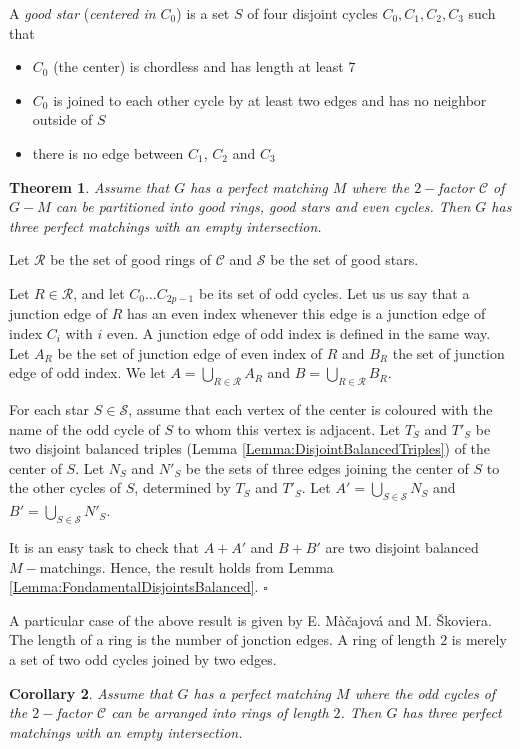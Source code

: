 \documentclass{elsart}
\theoremstyle{plain} \theoremheaderfont{\scshape}
\newtheorem{Thm}{\bf Theorem}
\newtheorem{Cor}[Thm]{ \bf Corollary}
{\theorembodyfont{\rmfamily}
 \newtheorem{Def}[Thm]{\bf Definition}
 \newtheorem{Rem}[Thm]{\bf Remark}
 \newtheorem{Question}[Thm]{\bf Question}
 \newtheorem{Problem}[Thm]{\bf Problem}
}
\newenvironment{Prf}{{\bf \noindent Proof } }{\hfill$\square$\\}
\begin{document}
A {\em good star} ({\em centered in $C_0$}) is a set $S$ of four
disjoint cycles $C_0,C_1,C_2,C_3$ such that
\begin{itemize}
  \item $C_0$ (the center) is chordless and has length at least $7$
  \item $C_0$ is joined to each other cycle by at
  least two edges and has no neighbor outside of $S$
  \item there is no edge between $C_1$, $C_2$ and $C_3$
\end{itemize}

\begin{Thm} \label{Theorem:GoodRingGoodStars}
Assume that $G$ has a perfect matching $M$ where the $2-$factor
$\mathcal C$ of $G-M$ can be partitioned into good rings, good stars
and even cycles. Then $G$ has three perfect matchings with an empty
intersection.
\end{Thm}
\begin{Prf}
Let $\mathcal R$ be the set of good rings of $\mathcal C$ and
$\mathcal S$ be the set of good stars.

Let $R \in \mathcal R$, and let $C_0 \ldots C_{2p-1}$ be its set of
odd cycles.  Let us us say that a junction edge of $R$ has an even
index whenever this edge is a junction edge of index $C_i$ with $i$
even. A junction edge of odd index is defined in the same way. Let
$A_R$ be the set of junction edge of even index of $R$ and $B_R$ the
set of junction edge of odd index. We let $A=\bigcup_{R \in \mathcal
R} A_R$ and $B=\bigcup_{R \in \mathcal R} B_R$.

For each star $S \in \mathcal S$, assume that each vertex of the
center is coloured with the name of the odd cycle of $S$ to whom
this vertex is adjacent.  Let $T_S$ and $T'_S$ be two disjoint
balanced triples (Lemma \ref{Lemma:DisjointBalancedTriples}) of the
center of $S$. Let $N_S$ and $N'_S$ be the sets of three edges
joining the center of $S$ to the other cycles of $S$, determined by
$T_S$ and $T'_S$. Let $A' = \bigcup_{S \in \mathcal S} N_S$ and
$B'=\bigcup_{S \in \mathcal S}N'_S$.




It is an easy task to check that $A + A'$ and $B+B'$ are two
disjoint balanced $M-$matchings. Hence, the result holds from Lemma
\ref{Lemma:FondamentalDisjointsBalanced}.
\end{Prf}

A particular case of the above result is given by E.
M\`{a}\v{c}ajov\'{a} and M. \v{S}koviera. The length of a ring is
the number of jonction edges. A ring of length $2$ is merely a set
of two odd cycles joined by two edges.
\begin{Cor}\cite{MacSko}Assume that $G$ has a perfect matching $M$ where the odd cycles of the $2-$factor
$\mathcal C$ can be arranged into rings of length $2$. Then $G$ has
three perfect matchings with an empty intersection.
\end{Cor}
\end{document}
